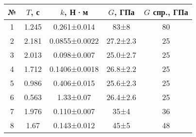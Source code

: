 \begin{tabular}{|c|c|c|c|c|}
\hline
№ & $T$, с & $k$, Н·м & $G$, ГПа & $G$ спр., ГПа \\ \hline
1 & 1.245 & 0.261±0.014 & 83±8 & 80 \\ \hline
2 & 2.181 & 0.0855±0.0022 & 27.2±2.3 & 25 \\ \hline
3 & 2.013 & 0.098±0.007 & 25.0±2.7 & 25 \\ \hline
4 & 1.712 & 0.1406±0.0018 & 26.8±2.2 & 25 \\ \hline
5 & 0.986 & 0.406±0.015 & 25.6±2.3 & 25 \\ \hline
6 & 0.563 & 1.33±0.07 & 26.4±2.6 & 25 \\ \hline
7 & 1.976 & 0.110±0.007 & 35±4 & 36 \\ \hline
8 & 1.67 & 0.143±0.012 & 45±5 & 48 \\ \hline
\end{tabular}